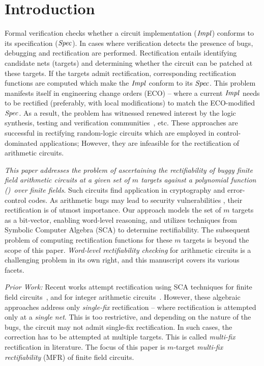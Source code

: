 \section{Introduction}\label{sec:intro}
Formal verification checks whether a circuit implementation
(${\it Impl}$) conforms to its specification (${\it Spec}$).  
In cases where verification detects the presence of bugs,
debugging and rectification are performed. Rectification entails
identifying candidate nets (targets) %
and determining whether the circuit can be patched at these 
targets. If the targets admit rectification,
corresponding rectification functions are computed which make 
the ${\it Impl}$ conform to its ${\it Spec}$.
This problem manifests itself in engineering change orders (ECO) 
-- where a current ${\it Impl}$ needs to be
rectified (preferably, with local modifications) to match the ECO-modified
${\it Spec}$. As a result, the problem
has witnessed renewed interest by the logic synthesis, testing and verification
communities~\cite{MF_Huang:DATE12,SS_Fujita:ISCAS19,SS_Roland:DAC19},
etc. These approaches are successful in rectifying random-logic
circuits which are employed in control-dominated applications; 
However, they
are infeasible for the rectification of arithmetic circuits.

\par
{\it This paper addresses the problem of ascertaining the rectifiability 
of buggy finite field arithmetic circuits at a given set of $m$ targets
against a polynomial function (\spec)~over finite fields}.
Such circuits find application in cryptography and error-control
codes. As arithmetic bugs may lead to security vulnerabilities
\cite{crypto:bug_attacks}, their rectification is of utmost
importance.
Our approach models the set of $m$ targets as a bit-vector, enabling 
word-level reasoning, and utilizes techniques 
from Symbolic Computer Algebra (SCA) to determine rectifiability. 
The subsequent problem of computing rectification functions for these
$m$ targets is beyond the scope of this paper. {\it Word-level
  rectifiability checking} for arithmetic circuits is a challenging
problem in its own right, and this manuscript covers its various
facets. 

\par 
{\it Prior Work:}  
Recent works attempt rectification using SCA techniques for finite field 
circuits~\cite{Utkarsh:VLSI18,Vkrao:FMCAD18}, and for integer
arithmetic circuits~\cite{farimah:2017:1,MF_Rolf:ISVLSI18}. 
However, these algebraic approaches address only
{\it single-fix} rectification -- where rectification is attempted
only at a {\it single net}. This is too restrictive, and depending on
the nature of the bugs, the circuit may not admit single-fix
rectification. In such cases, the correction has to be
attempted at multiple targets. This is
called {\it multi-fix} rectification in literature. The focus of
this paper is $m$-target {\it multi-fix rectifiability} (MFR) of finite field circuits. 


